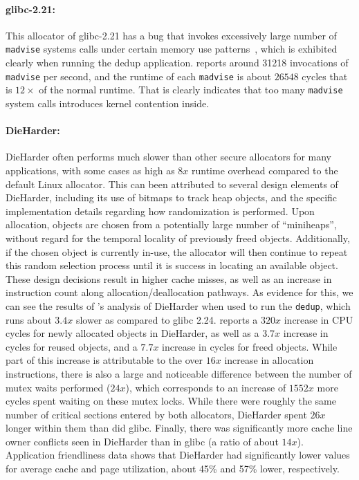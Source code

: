 \paragraph{glibc-2.21:}
This allocator of glibc-2.21 has a bug that invokes excessively large number of \texttt{madvise} systems calls under certain memory use patterns~\cite{madvise}, which is exhibited clearly when running the dedup application. \MP{} reports around 31218 invocations of \texttt{madvise} per second, and the runtime of each \texttt{madvise} is about $26548$ cycles that is $12\times$ of the normal runtime.  That is clearly indicates that too many \texttt{madvise} system calls introduces kernel contention inside. 

\paragraph{DieHarder:}
DieHarder often performs much slower than other secure allocators for many applications, with some cases as high as $8x$ runtime overhead compared to the default Linux allocator. This can been attributed to several design elements of DieHarder, including its use of bitmaps to track heap objects, and the specific implementation details regarding how randomization is performed. Upon allocation, objects are chosen from a potentially large number of ``miniheaps'', without regard for the temporal locality of previously freed objects. Additionally, if the chosen object is currently in-use, the allocator will then continue to repeat this random selection process until it is success in locating an available object. These design decisions result in higher cache misses, as well as an increase in instruction count along allocation/deallocation pathways.
As evidence for this, we can see the results of \MP{}'s analysis of DieHarder when used to run the \texttt{dedup}, which runs about $3.4x$ slower as compared to glibc 2.24. \MP{} reports a $320x$ increase in CPU cycles for newly allocated objects in DieHarder, as well as a $3.7x$ increase in cycles for reused objects, and a $7.7x$ increase in cycles for freed objects.
While part of this increase is attributable to the over $16x$ increase in allocation instructions, there is also a large and noticeable difference between the number of mutex waits performed ($24x$), which corresponds to an increase of $1552x$ more cycles spent waiting on these mutex locks. While there were roughly the same number of critical sections entered by both allocators, DieHarder spent $26x$ longer within them than did glibc.
Finally, there was significantly more cache line owner conflicts seen in DieHarder than in glibc (a ratio of about $14x$). Application friendliness data shows that DieHarder had significantly lower values for average cache and page utilization, about 45\% and 57\% lower, respectively.

